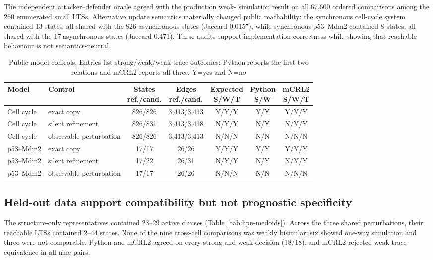 \documentclass[JMCS,submit]{resources/ISRP}
\theoremstyle{definition}
\theoremstyle{remark}
\numberwithin{equation}{section}
\begin{document}
The independent attacker--defender oracle agreed with the production weak-
simulation result on all 67,600 ordered comparisons among the 260 enumerated
small LTSs. Alternative update semantics materially changed public reachability:
the synchronous cell-cycle system contained 13 states, all shared with the 826
asynchronous states (Jaccard 0.0157), while synchronous p53--Mdm2 contained 8
states, all shared with the 17 asynchronous states (Jaccard 0.471). These audits
support implementation correctness while showing that reachable behaviour is
not semantics-neutral.

\begin{table}[t]
\caption{Public-model controls. Entries list strong/weak/weak-trace outcomes;
Python reports the first two relations and mCRL2 reports all three. Y=yes and
N=no}\label{tab:public-controls}
\centering
\scriptsize
\setlength{\tabcolsep}{3pt}
\begin{tabular*}{\textwidth}{@{\extracolsep{\fill}}llccccc}
\toprule
Model & Control & \shortstack{States\\ref./cand.} & \shortstack{Edges\\ref./cand.} & \shortstack{Expected\\S/W/T} & \shortstack{Python\\S/W} & \shortstack{mCRL2\\S/W/T} \\
\midrule
Cell cycle & exact copy & 826/826 & 3,413/3,413 & Y/Y/Y & Y/Y & Y/Y/Y \\
Cell cycle & silent refinement & 826/831 & 3,413/3,418 & N/Y/Y & N/Y & N/Y/Y \\
Cell cycle & observable perturbation & 826/826 & 3,413/3,413 & N/N/N & N/N & N/N/N \\
p53--Mdm2 & exact copy & 17/17 & 26/26 & Y/Y/Y & Y/Y & Y/Y/Y \\
p53--Mdm2 & silent refinement & 17/22 & 26/31 & N/Y/Y & N/Y & N/Y/Y \\
p53--Mdm2 & observable perturbation & 17/17 & 26/26 & N/N/N & N/N & N/N/N \\
\bottomrule
\end{tabular*}
\end{table}

\subsection{Held-out data support compatibility but not prognostic specificity}
\label{sec:hpn-results}

The structure-only representatives contained 23--29 active clauses
(Table~\ref{tab:hpn-medoids}). Across the three shared perturbations, their
reachable LTSs contained 2--44 states. None of the nine cross-cell comparisons
was weakly bisimilar: six showed one-way simulation and three were not comparable.
Python and mCRL2 agreed on every strong and weak decision (18/18), and mCRL2
rejected weak-trace equivalence in all nine pairs.
\end{document}
